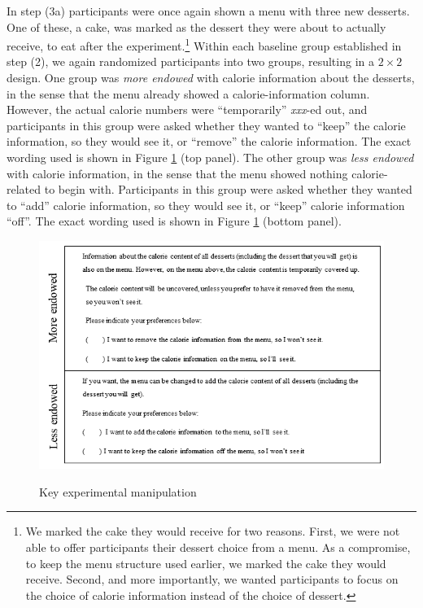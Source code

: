 In step (3a) participants were once again shown a menu with three new desserts. One of these, a cake, was marked as the dessert they were about to actually receive, to eat after the experiment.\footnote{We marked the cake they would receive for two reasons. First, we were not able to offer participants their dessert choice from a menu. As a compromise, to keep the menu structure used earlier, we marked the cake they would receive. Second, and more importantly, we wanted participants to focus on the choice of calorie information instead of the choice of dessert.} Within each baseline group established in step (2), we again randomized participants into two groups, resulting in a $2 \times 2$ design. One group was \emph{more endowed} with calorie information about the desserts, in the sense that the menu already showed a calorie-information column. However, the actual calorie numbers were \enquote{temporarily} \emph{xxx}-ed out, and participants in this group were asked whether they wanted to \enquote{keep} the calorie information, so they would see it, or \enquote{remove} the calorie information. The exact wording used is shown in Figure \ref{fig:expManipulation} (top panel). The other group was \emph{less endowed} with calorie information, in the sense that the menu showed nothing calorie-related to begin with. Participants in this group were asked whether they wanted to \enquote{add} calorie information, so they would see it, or \enquote{keep} calorie information \enquote{off}. The exact wording used is shown in Figure  \ref{fig:expManipulation} (bottom panel).

\begin{figure}[ht]
  \caption{Key experimental manipulation}\label{fig:expManipulation}
  \begin{center}
  {\includegraphics[width=1\textwidth]{./figures/keyManipulation.png}}
  \end{center}
\end{figure}

